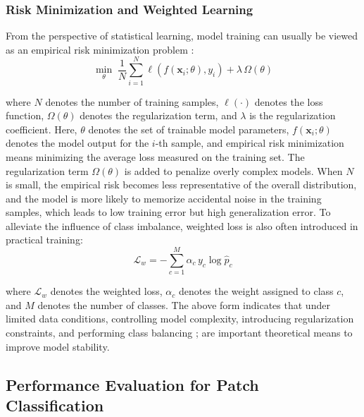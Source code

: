 \subsubsection{Risk Minimization and Weighted Learning}
\par From the perspective of statistical learning, model training can usually be
viewed as an empirical risk minimization problem
\cite[pp.~103--198,~337--355]{murphy2022pml}:
\begin{equation}
    \min_{\theta}\;
    \frac{1}{N}\sum_{i=1}^{N}\ell\!\left(f(\mathbf{x}_i;\theta),y_i\right)
    +\lambda\,\Omega(\theta)
    \label{eq:erm-basic}
\end{equation}
\par where $N$ denotes the number of training samples, $\ell(\cdot)$ denotes the
loss function, $\Omega(\theta)$ denotes the regularization term, and $\lambda$
is the regularization coefficient. Here, $\theta$ denotes the set of trainable
model parameters, $f(\mathbf{x}_i;\theta)$ denotes the model output for the
$i$-th sample, and empirical risk minimization means minimizing the average loss
measured on the training set. The regularization term $\Omega(\theta)$ is added
to penalize overly complex models. When $N$ is small, the empirical risk becomes
less representative of the overall distribution, and the model is more likely to
memorize accidental noise in the training samples, which leads to low training
error but high generalization error. To alleviate the influence of class
imbalance, weighted loss is also often introduced in practical training:
\begin{equation}
    \mathcal{L}_{w}=
    -\sum_{c=1}^{M}\alpha_c\,y_c\log \hat{p}_c
    \label{eq:weighted-loss-basic}
\end{equation}
\par where $\mathcal{L}_{w}$ denotes the weighted loss, $\alpha_c$ denotes the
weight assigned to class $c$, and $M$ denotes the number of classes. The above
form indicates that under limited data conditions, controlling model complexity,
introducing regularization constraints, and performing class balancing
\cite[pp.~224--270]{goodfellow2016deep}; \cite{Cui_2019_CVPR} are important
theoretical means to improve model stability.

\subsection{Performance Evaluation for Patch Classification}
